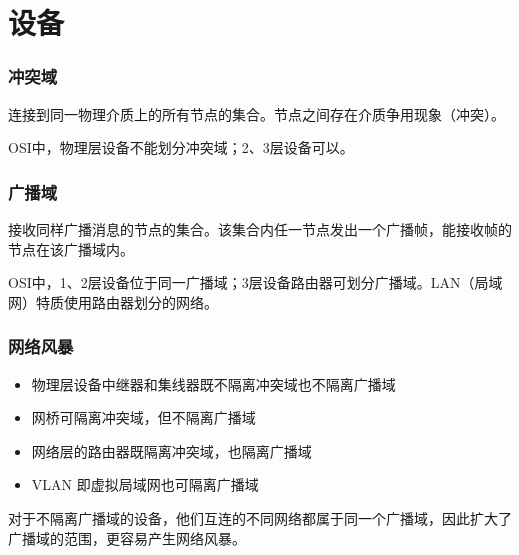 
\chapter{设备}


\subsection{冲突域}
连接到同一物理介质上的所有节点的集合。节点之间存在介质争用现象（冲突）。

OSI中，物理层设备不能划分冲突域；2、3层设备可以。


\subsection{广播域}
接收同样广播消息的节点的集合。该集合内任一节点发出一个广播帧，能接收帧的节点在该广播域内。

OSI中，1、2层设备位于同一广播域；3层设备路由器可划分广播域。LAN（局域网）特质使用路由器划分的网络。


\subsection{网络风暴}
\begin{itemize}
    \item 物理层设备中继器和集线器既不隔离冲突域也不隔离广播域
    \item 网桥可隔离冲突域，但不隔离广播域
    \item 网络层的路由器既隔离冲突域，也隔离广播域
    \item VLAN 即虚拟局域网也可隔离广播域
\end{itemize}
对于不隔离广播域的设备，他们互连的不同网络都属于同一个广播域，因此扩大了广播域的范围，更容易产生网络风暴。

